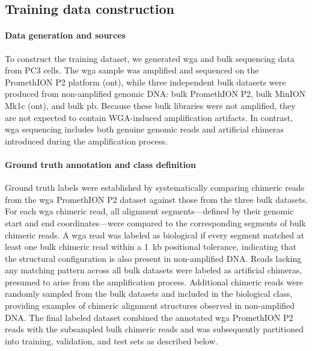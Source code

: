 \documentclass[pdflatex,lineno]{sn-jnl}%
\begin{document}
\subsection*{Training data construction}

\paragraph{Data generation and sources}
To construct the training dataset, we generated \gls{wga} and bulk sequencing data from PC3 cells.
The \gls{wga} sample was amplified and sequenced on the PromethION P2 platform (\gls{ont}), while three independent bulk datasets were produced from non-amplified genomic DNA: bulk PromethION P2, bulk MinION Mk1c (\gls{ont}), and bulk \gls{pb}.
Because these bulk libraries were not amplified, they are not expected to contain WGA-induced amplification artifacts.
In contrast, \gls{wga} sequencing includes both genuine genomic reads and artificial chimeras introduced during the amplification process.

\paragraph{Ground truth annotation and class definition}
Ground truth labels were established by systematically comparing chimeric reads from the \gls{wga} PromethION P2 dataset against those from the three bulk datasets.
For each \gls{wga} chimeric read, all alignment segments---defined by their genomic start and end coordinates---were compared to the corresponding segments of bulk chimeric reads.
A \gls{wga} read was labeled as biological if every segment matched at least one bulk chimeric read within a 1~kb positional tolerance, indicating that the structural configuration is also present in non-amplified DNA.
Reads lacking any matching pattern across all bulk datasets were labeled as artificial chimeras, presumed to arise from the amplification process.
Additional chimeric reads were randomly sampled from the bulk datasets and included in the biological class, providing examples of chimeric alignment structures observed in non-amplified DNA.
The final labeled dataset combined the annotated \gls{wga} PromethION P2 reads with the subsampled bulk chimeric reads and was subsequently partitioned into training, validation, and test sets as described below.
\end{document}
